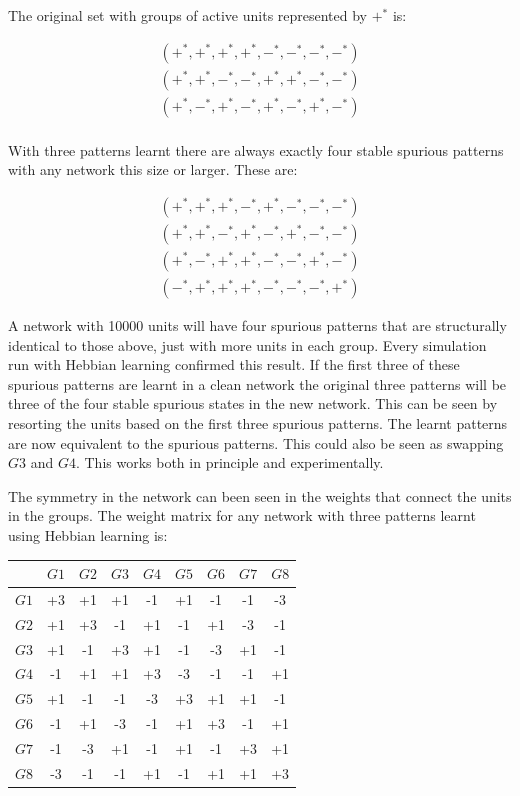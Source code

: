 The original set with groups of active units represented by $+^{*}$ is:
\begin{footnotesize}
\[
\begin {array}{c}
(+^{*},+^{*},+^{*},+^{*},-^{*},-^{*},-^{*},-^{*})\\  
(+^{*},+^{*},-^{*},-^{*},+^{*},+^{*},-^{*},-^{*})\\
(+^{*},-^{*},+^{*},-^{*},+^{*},-^{*},+^{*},-^{*})\\
\end{array}
\]\end{footnotesize}

With three patterns learnt there are always exactly four stable spurious patterns with any network this size or larger.   These are:
\begin{footnotesize}
\[
\begin {array}{c}
(+^{*},+^{*},+^{*},-^{*},+^{*},-^{*},-^{*},-^{*})\\  %
(+^{*},+^{*},-^{*},+^{*},-^{*},+^{*},-^{*},-^{*})\\
(+^{*},-^{*},+^{*},+^{*},-^{*},-^{*},+^{*},-^{*})\\
(-^{*},+^{*},+^{*},+^{*},-^{*},-^{*},-^{*},+^{*})
\end{array}
\]
\end{footnotesize}

A network with 10000 units will have four spurious patterns that are structurally identical to those above, just with more units in each group. Every simulation run with Hebbian learning confirmed this result. If the first three of these spurious patterns are learnt in a clean network the original three patterns will be three of the four stable spurious states in the new network.  This can be seen by resorting the units based on the first three spurious patterns. The learnt patterns are now equivalent to the spurious patterns.  This could also be seen as swapping $G3$ and $G4$.  This works both in principle and experimentally. 

The symmetry in the network can been seen in the weights that connect the units in the groups.  The weight matrix for any network with three patterns learnt using Hebbian learning is:
\begin{center}
\begin{tabular}{c|cccccccc}
   &$G1$&$G2$&$G3$&$G4$&$G5$&$G6$&$G7$&$G8$\\
   \hline
$G1$&+3&+1&+1&-1&+1&-1&-1&-3\\
$G2$&+1&+3&-1&+1&-1&+1&-3&-1\\
$G3$&+1&-1&+3&+1&-1&-3&+1&-1\\
$G4$&-1&+1&+1&+3&-3&-1&-1&+1\\
$G5$&+1&-1&-1&-3&+3&+1&+1&-1\\
$G6$&-1&+1&-3&-1&+1&+3&-1&+1\\
$G7$&-1&-3&+1&-1&+1&-1&+3&+1\\
$G8$&-3&-1&-1&+1&-1&+1&+1&+3\\
\end{tabular}
\end{center}

